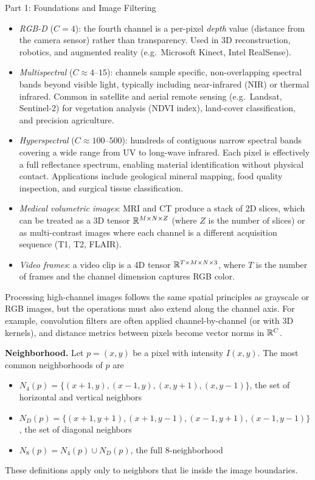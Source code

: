 \documentclass[letterpaper]{article}
\begin{document}
\begin{notes}{Part 1: Foundations and Image Filtering}
\begin{itemize}
    \item \emph{RGB-D} ($C=4$): the fourth channel is a per-pixel \emph{depth} value (distance from the camera sensor) rather than transparency. Used in 3D reconstruction, robotics, and augmented reality (e.g.\ Microsoft Kinect, Intel RealSense).
    \item \emph{Multispectral} ($C \approx 4$–$15$): channels sample specific, non-overlapping spectral bands beyond visible light, typically including near-infrared (NIR) or thermal infrared. Common in satellite and aerial remote sensing (e.g.\ Landsat, Sentinel-2) for vegetation analysis (NDVI index), land-cover classification, and precision agriculture.
    \item \emph{Hyperspectral} ($C \approx 100$–$500$): hundreds of contiguous narrow spectral bands covering a wide range from UV to long-wave infrared. Each pixel is effectively a full reflectance spectrum, enabling material identification without physical contact. Applications include geological mineral mapping, food quality inspection, and surgical tissue classification.
    \item \emph{Medical volumetric images}: MRI and CT produce a stack of 2D slices, which can be treated as a 3D tensor $\mathbb{R}^{M\times N\times Z}$ (where $Z$ is the number of slices) or as multi-contrast images where each channel is a different acquisition sequence (T1, T2, FLAIR).
    \item \emph{Video frames}: a video clip is a 4D tensor $\mathbb{R}^{T\times M\times N\times 3}$, where $T$ is the number of frames and the channel dimension captures RGB color.
\end{itemize}

Processing high-channel images follows the same spatial principles as grayscale or RGB images, but the operations must also extend along the channel axis. For example, convolution filters are often applied channel-by-channel (or with 3D kernels), and distance metrics between pixels become vector norms in $\mathbb{R}^C$.



\columnbreaknofill


\textbf{Neighborhood.} Let $p=(x,y)$ be a pixel with intensity $I(x,y)$.
The most common neighborhoods of $p$ are
\begin{itemize}
    \item $N_4(p)=\{(x+1,y), (x-1,y), (x,y+1), (x,y-1)\}$, the set of horizontal and vertical neighbors
    \item $N_D(p)=\{(x+1,y+1), (x+1,y-1), (x-1,y+1), (x-1,y-1)\}$, the set of diagonal neighbors
    \item $N_8(p)=N_4(p)\cup N_D(p)$, the full 8-neighborhood
\end{itemize}
These definitions apply only to neighbors that lie inside the image boundaries.


\end{notes}
\end{document}
